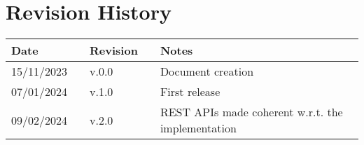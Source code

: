 \chapter*{Revision History}

\begin{table}[h]
    \centering
    \begin{tabular}{l p{2.5cm} l p{2.5cm} p{4cm}}
        \hline
        \textbf{Date} &  & \textbf{Revision} &  & \textbf{Notes}                                    \\ \hline
        15/11/2023    &  & v.0.0             &  & Document creation                                 \\
        07/01/2024    &  & v.1.0             &  & First release                                     \\
        09/02/2024    &  & v.2.0             &  & REST APIs made coherent w.r.t. the implementation \\ \hline
    \end{tabular}
\end{table}

\newpage